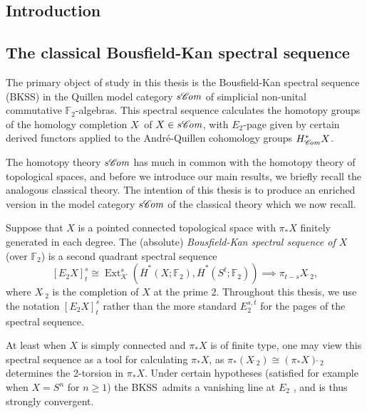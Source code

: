 \documentclass[11pt]{amsart} \renewcommand{\baselinestretch}{1.2}
\theoremstyle{plain}
\numberwithin{equation}{section} %
\theoremstyle{plain}
\numberwithin{equation}{chapter} %
\DeclareMathOperator{\Ext}{Ext}
\newcommand{\scrL}{\mathscr{L}}
\newcommand{\scrC}{\mathscr{C}}
\newcommand{\calk}{\mathcal{K}}
\newcommand{\F}{\mathbb{F}}
\newcommand{\algs}{{\scrC\!\textit{\normalfont\textit{om}}}}
\newcommand{\liealgs}{{\scrL\!\textit{ie}}}
\newcommand{\Ftwo}{\F_2}
\newcommand{\E}[5]{[E^{#1}_{#2}#3]^{#4}_{#5}}
\newcommand{\BKSS}{BKSS}
\newcommand{\SectionOrChapter}[1]{\section{\textbf{#1}}}
\newcommand{\SubsectionOrSection}[1]{\subsection{#1}}
\begin{document}

\begin{Introduction}
\SectionOrChapter{Introduction}
\label{intropart1}

\SubsectionOrSection{The classical Bousfield-Kan spectral sequence}
\label{Classicalstuff}

The primary object of study in this thesis is the Bousfield-Kan spectral sequence (\BKSS) in the Quillen model category $s\algs$ of simplicial non-unital commutative  $\Ftwo$-algebras. This spectral sequence  calculates the homotopy groups of the homology completion $X\hat{\ }$ of $X\in s\algs$, with $E_2$-page given by certain derived functors applied to the Andr\'e-Quillen cohomology groups $H^*_{\algs}X$. 

The homotopy theory $s\algs$ has much in common with the homotopy theory of topological spaces,  and before we introduce our main results, we briefly recall the analogous classical theory. 
The intention of this thesis is to produce an enriched version in the model category $s\algs$ of the classical theory which we now recall. %

Suppose that $X$ is a pointed connected topological space with $\pi_*X$ finitely generated in each degree. 
The (absolute) \emph{Bousfield-Kan spectral sequence of $X$} (over $\Ftwo$) is a second quadrant spectral sequence
\[\E{}{2}{X}{s}{t}\cong \Ext^s_{\calk}(\overline{H}^*(X;\Ftwo),\overline{H}^*(S^t;\Ftwo))\implies \pi_{t-s}X\hat{\ }_{\!\!\!2},\]
where $X\hat{\ }_{\!\!\!2}$ is the completion of $X$ at the prime 2. Throughout this thesis, we use the notation $\E{}{2}{X}{s}{t}$ rather than the more standard $E_{2}^{s,t}$ for the pages of the spectral sequence.


At least when $X$ is simply connected and $\pi_*X$ is of finite type, one may view this spectral sequence as  a tool for calculating $\pi_*X$, as
$\pi_*(X\hat{\ }_{\!\!\!2})\cong (\pi_*X)\hat{\ }_{\!\!\!2}$
determines the 2-torsion in $\pi_*X$. Under certain hypotheses (satisfied for example when $X=S^n$ for $n\geq1$) the \BKSS\ admits a vanishing line at $E_2$  \cite{MR0266212}, and is thus strongly convergent.


\end{Introduction}
\end{document}
